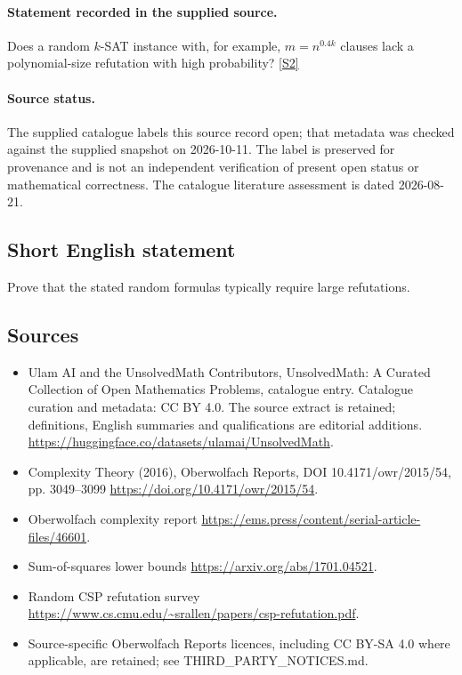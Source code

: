 \documentclass[11pt]{article}
\begin{document}
\paragraph{Statement recorded in the supplied source.}
Does a random $k$-SAT instance with, for example, $m=n^{0.4k}$ clauses lack a polynomial-size refutation with high probability? \href{https://doi.org/10.4171/owr/2015/54}{[S2]}
\paragraph{Source status.}
The supplied catalogue labels this source record open; that metadata was checked against the supplied snapshot on 2026-10-11. The label is preserved for provenance and is not an independent verification of present open status or mathematical correctness. The catalogue literature assessment is dated 2026-08-21.
\subsection{Short English statement}
Prove that the stated random formulas typically require large refutations.
\subsection{Sources}
\begin{itemize}
\item[S1] Ulam AI and the UnsolvedMath Contributors, UnsolvedMath: A Curated Collection of Open Mathematics Problems, catalogue entry. Catalogue curation and metadata: CC BY 4.0. The source extract is retained; definitions, English summaries and qualifications are editorial additions.
\url{https://huggingface.co/datasets/ulamai/UnsolvedMath}.
\item[S2] Complexity Theory (2016), Oberwolfach Reports, DOI 10.4171/owr/2015/54, pp. 3049--3099
\url{https://doi.org/10.4171/owr/2015/54}.
\item[S3] Oberwolfach complexity report
\url{https://ems.press/content/serial-article-files/46601}.
\item[S4] Sum-of-squares lower bounds
\url{https://arxiv.org/abs/1701.04521}.
\item[S5] Random CSP refutation survey
\url{https://www.cs.cmu.edu/~srallen/papers/csp-refutation.pdf}.
\item Source-specific Oberwolfach Reports licences, including CC BY-SA 4.0 where applicable, are retained; see THIRD\_PARTY\_NOTICES.md.
\end{itemize}
\end{document}
